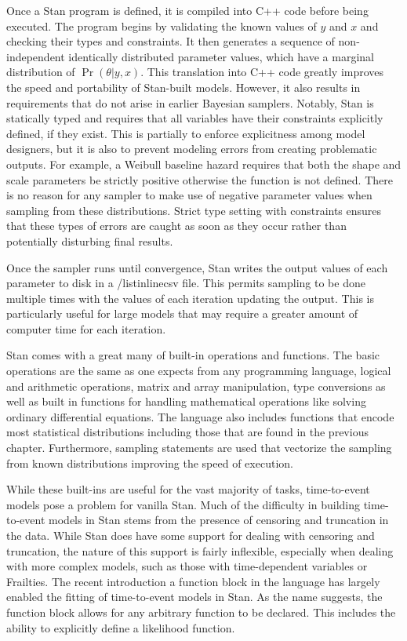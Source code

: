 Once a Stan program is defined, it is compiled into C++ code before being executed. The program begins by validating the known values of $y$ and $x$ and checking their types and constraints. It then generates a sequence of non-independent identically distributed parameter values, which have a marginal distribution of $\Pr(\theta|y,x)$. This translation into C++ code greatly improves the speed and portability of Stan-built models. However, it also results in requirements that do not arise in earlier Bayesian samplers. Notably, Stan is statically typed and requires that all variables have their constraints explicitly defined, if they exist. This is partially to enforce explicitness among model designers, but it is also to prevent modeling errors from creating problematic outputs. For example, a Weibull baseline hazard requires that both the shape and scale parameters be strictly positive otherwise the function is not defined. There is no reason for any sampler to make use of negative parameter values when sampling from these distributions. Strict type setting with constraints ensures that these types of errors are caught as soon as they occur rather than potentially disturbing final results. 

Once the sampler runs until convergence, Stan writes the output values of each parameter to disk in a /listinline{csv} file. This permits sampling to be done multiple times with the values of each iteration updating the output. This is particularly useful for large models that may require a greater amount of computer time for each iteration.

Stan comes with a great many of built-in operations and functions. The basic operations are the same as one expects from any programming language, logical and arithmetic operations, matrix and array manipulation, type conversions as well as built in functions for handling mathematical operations like solving ordinary differential equations. The language also includes functions that encode most statistical distributions including those that are found in the previous chapter. Furthermore, sampling statements are used that vectorize the sampling from known distributions improving the speed of execution. 

While these built-ins are useful for the vast majority of tasks, time-to-event models pose a problem for vanilla Stan. Much of the difficulty in building time-to-event models in Stan stems from the presence of censoring and truncation in the data. While Stan does have some support for dealing with censoring and truncation, the nature of this support is fairly inflexible, especially when dealing with more complex models, such as those with time-dependent variables or Frailties. The recent introduction a function block in the language has largely enabled the fitting of time-to-event models in Stan. As the name suggests, the function block allows for any arbitrary function to be declared. This includes the ability to explicitly define a likelihood function.


